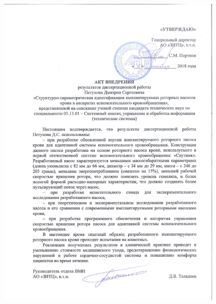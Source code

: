 \begin{figure}[ht] 
  \center
  \includegraphics [scale=0.67] {../images/act_1}
\end{figure}
\newpage
